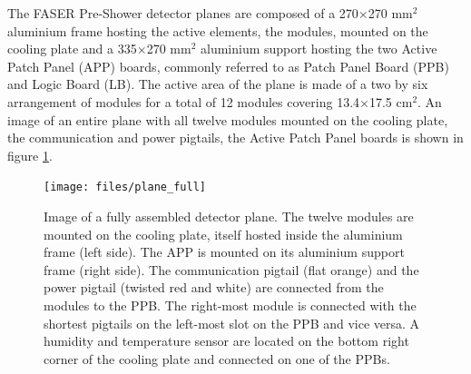 		The FASER Pre-Shower detector planes are composed of a 270$\times$270 mm$^2$ aluminium frame hosting the active elements, the modules, mounted on the cooling plate and a 335$\times$270 mm$^2$ aluminium support hosting the two Active Patch Panel (APP) boards, commonly referred to as Patch Panel Board (PPB) and Logic Board (LB). The active area of the plane is made of a two by six arrangement of modules for a total of 12 modules covering 13.4$\times$17.5 cm$^2$. An image of an entire plane with all twelve modules mounted on the cooling plate, the communication and power pigtails, the Active Patch Panel boards is shown in figure \ref{im:plane_full}.
		\begin{figure}[h]
			\centering
			\texttt{[image: files/plane\_full]}
			\caption{Image of a fully assembled detector plane. The twelve modules are mounted on the cooling plate, itself hosted inside the aluminium frame (left side). The APP is mounted on its aluminium support frame (right side). The communication pigtail (flat orange) and the power pigtail (twisted red and white) are connected from the modules to the PPB. The right-most module is connected with the shortest pigtails on the left-most slot on the PPB and vice versa. A humidity and temperature sensor are located on the bottom right corner of the cooling plate and connected on one of the PPBs.}
			\label{im:plane_full}
		\end{figure}

